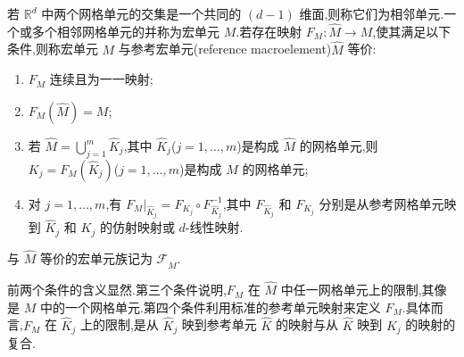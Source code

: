 \begin{definition}\label{def:macroelement}
若 $\mathbb{R}^d$ 中两个网格单元的交集是一个共同的 $(d-1)$ 维面,则称它们为相邻单元.一个或多个相邻网格单元的并称为宏单元 $M$.若存在映射 $F_M:\widehat M\to M$,使其满足以下条件,则称宏单元 $M$ 与参考宏单元(reference macroelement)$\widehat M$ 等价:
\begin{enumerate}[label=\roman*)]
  \item $F_M$ 连续且为一一映射;
  \item $F_M(\widehat M)=M$;
  \item 若 $\widehat M=\bigcup_{j=1}^{m}\widehat K_j$,其中 $\widehat K_j$($j=1,\ldots,m$)是构成 $\widehat M$ 的网格单元,则 $K_j=F_M(\widehat K_j)$($j=1,\ldots,m$)是构成 $M$ 的网格单元;
  \item 对 $j=1,\ldots,m$,有
    $F_M|_{\widehat K_j}=F_{K_j}\circ F_{\widehat K_j}^{-1}$,其中 $F_{\widehat K_j}$ 和 $F_{K_j}$ 分别是从参考网格单元映到 $\widehat K_j$ 和 $K_j$ 的仿射映射或 $d$-线性映射.
\end{enumerate}
与 $\widehat M$ 等价的宏单元族记为 $\mathcal{F}_{\widehat M}$.
\end{definition}

\begin{note}[关于宏单元]\label{note:macroelement-properties}
前两个条件的含义显然.第三个条件说明,$F_M$ 在 $\widehat M$ 中任一网格单元上的限制,其像是 $M$ 中的一个网格单元.第四个条件利用标准的参考单元映射来定义 $F_M$.具体而言,$F_M$ 在 $\widehat K_j$ 上的限制,是从 $\widehat K_j$ 映到参考单元 $\widehat K$ 的映射与从 $\widehat K$ 映到 $K_j$ 的映射的复合.
\end{note}

